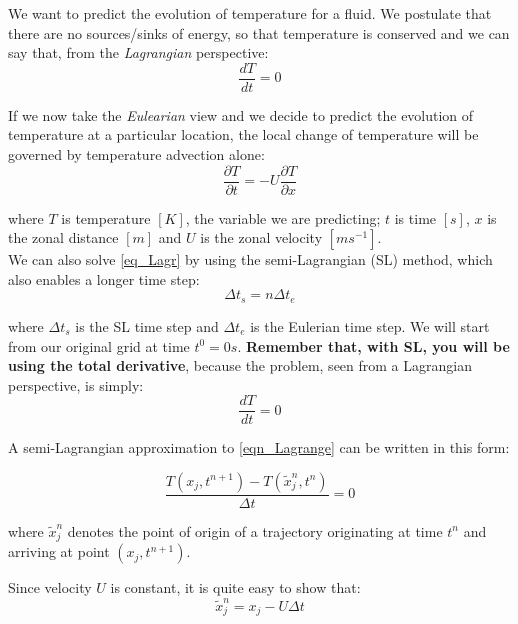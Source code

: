 We want to predict the evolution of temperature for a fluid. We postulate that there are no sources/sinks of energy, so that temperature is conserved and we can say that, from the \emph{Lagrangian} perspective:
\begin{equation}
\frac{d T } {d t} = 0
\label{eq_Lagr}
\end{equation}

If we now take the \emph{Eulearian} view and we decide to predict the evolution of temperature at a particular location, the local change of temperature will be governed by temperature advection alone: 
\begin{equation}
\frac{\partial T } {\partial t} = -U \frac{\partial T } {\partial x}
\label{eq_Eul}
\end{equation}

where $T$ is temperature $[K]$, the variable we are predicting; $t$ is time $[s]$, $x$ is the zonal distance $[m]$ and $U$ is the zonal velocity $[ms^{-1}]$.\\

We can also solve \ref{eq_Lagr} by using the semi-Lagrangian (SL) method, which also enables a longer time step: 
\begin{equation}
\Delta t_{s}=n\Delta t_{e}
\end{equation}

where $\Delta t_{s}$ is the SL time step and $\Delta t_{e}$ is the Eulerian time step.
We will start from our original grid at time $t^0=0s$. \textbf{Remember that, with SL, you will be using the total derivative}, because the problem, seen from a Lagrangian perspective, is simply:
\begin{equation}
\frac{d T } {d t} = 0
\label{eqn_Lagrange}
\end{equation}

A semi-Lagrangian approximation to \ref{eqn_Lagrange} can be written in this form:

\begin{equation}
\frac {T(x_j,t^{n+1})-T(\tilde{x}^n_j,t^n)}{\Delta t} = 0
\end{equation}

where $\tilde{x}^n_j$ denotes the point of origin of a trajectory originating at time $t^n$ and arriving at point $(x_j,t^{n+1})$.

Since velocity $U$ is constant, it is quite easy to show that:
\begin{equation}
\tilde{x}^n_j=x_j-U \Delta t
\label{eqn_departure_point}
\end{equation}



